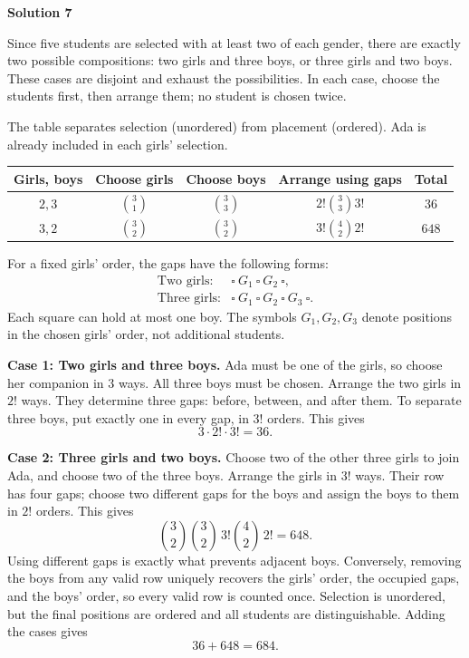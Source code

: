 \documentclass[11pt]{article}
\newcommand{\solution}[1]{%
  \par\Needspace{5\baselineskip}\addvspace{.8\baselineskip}%
  {\large\bfseries Solution #1\par}\nopagebreak[4]}
\begin{document}
\clearpage
\solution{7}
Since five students are selected with at least two of each gender, there
are exactly two possible compositions: two girls and three boys, or
three girls and two boys. These cases are disjoint and exhaust the possibilities.
In each case, choose the students first, then arrange them; no student
is chosen twice.

The table separates selection (unordered) from placement (ordered).
Ada is already included in each girls' selection.
\begin{center}
\renewcommand{\arraystretch}{1.2}
\begin{tabular}{@{}ccccc@{}}
\toprule
Girls, boys & Choose girls & Choose boys & Arrange using gaps & Total \\
\midrule
$2,3$ & $\binom31$ & $\binom33$ & $2!\binom33 3!$ & $36$ \\
$3,2$ & $\binom32$ & $\binom32$ & $3!\binom42 2!$ & $648$ \\
\bottomrule
\end{tabular}
\end{center}
For a fixed girls' order, the gaps have the following forms:
\[
\begin{array}{ll}
\text{Two girls:}&\square\ G_1\ \square\ G_2\ \square,\\[4pt]
\text{Three girls:}&\square\ G_1\ \square\ G_2\ \square\ G_3\ \square.
\end{array}
\]
Each square can hold at most one boy. The symbols $G_1,G_2,G_3$ denote
positions in the chosen girls' order, not additional students.

\textbf{Case 1: Two girls and three boys.}
Ada must be one of the girls, so choose her companion in $3$ ways.
All three boys must be chosen. Arrange the two girls in $2!$ ways.
They determine three gaps: before, between, and after them. To separate
three boys, put exactly one in every gap, in $3!$ orders. This gives
\[
3\cdot2!\cdot3!=36.
\]

\textbf{Case 2: Three girls and two boys.}
Choose two of the other three girls to join Ada, and choose two of the
three boys. Arrange the girls in $3!$ ways. Their row has four gaps;
choose two different gaps for the boys and assign the boys to them
in $2!$ orders. This gives
\[
\binom32\binom32\,3!\binom42\,2!=648.
\]
Using different gaps is exactly what prevents adjacent boys. Conversely,
removing the boys from any valid row uniquely recovers the girls' order,
the occupied gaps, and the boys' order, so every valid row is counted once.
Selection is unordered, but the final positions are ordered and all
students are distinguishable. Adding the cases gives
\[
36+648=\boxed{684}.
\]
\end{document}
